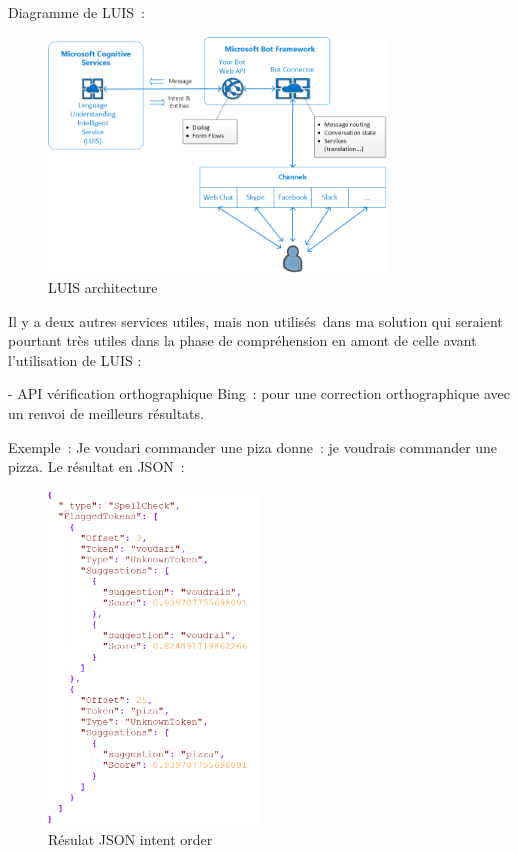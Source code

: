 Diagramme de LUIS : 

\begin{figure}[H]
	\centering
		\includegraphics[width = 0.8\textwidth]{LUIS.png}
	\caption{LUIS architecture}
	\label{fig:LUIS architecture}
\end{figure}

Il y a deux autres services utiles, mais non utilisés dans ma solution qui seraient pourtant très utiles dans la phase de compréhension en amont de celle avant l’utilisation de LUIS :
\vspace{1em}

- API vérification orthographique Bing : pour une correction orthographique avec un renvoi de meilleurs résultats.
\vspace{1em}

Exemple : Je voudari commander une piza donne : je voudrais commander une pizza.
Le résultat en JSON :

\begin{figure}[H]
	\centering
		\includegraphics[width = 0.5\textwidth]{JSON.png}
	\caption{Résulat JSON intent order}
	\label{fig:Résulat JSON intent order}
\end{figure}

